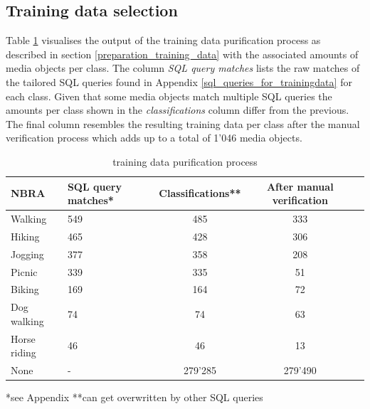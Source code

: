 \subsection{Training data selection}
Table \ref{tab:trainingsdata} visualises the output of the training data purification process as described in section \ref{preparation_training_data} with the associated amounts of media objects per class. The column \textit{SQL query matches} lists the raw matches of the tailored SQL queries found in Appendix \ref{sql_queries_for_trainingdata} for each class. Given that some media objects match multiple SQL queries the amounts per class shown in the \textit{classifications} column differ from the previous. The final column resembles the resulting training data per class after the manual verification process which adds up to a total of 1'046 media objects. 

\begin{table}[!htb]
\begin{center}
\caption{training data purification process}\vspace{1ex}
\label{tab:trainingsdata}
\begin{tabular}{llccc}\hline
NBRA & SQL query matches* & Classifications** & After manual verification \\ \hline
Walking & 549 & 485 & 333 \\
Hiking & 465 & 428 & 306 \\
Jogging & 377 & 358 & 208 \\
Picnic & 339 & 335 & 51 \\
Biking & 169 & 164 & 72 \\
Dog walking & 74 & 74 & 63 \\
Horse riding & 46 & 46 & 13 \\
None & - & 279'285 & 279'490 \\ \hline
\end{tabular}
\newline
*see Appendix **can get overwritten by other SQL queries
\end{center}
\end{table}


